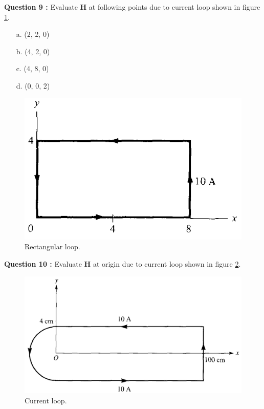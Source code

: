 \documentclass[12pt,a4paper]{article}
\begin{document}
\noindent\textbf{Question 9 \cite[Problem 7.9, page 298]{Sadiku}:} Evaluate \textbf{H} at following points due to current loop shown in figure \ref{rectangular-loop}.
\begin{itemize}
\item[a.] (2, 2, 0)
\item[b.] (4, 2, 0)
\item[c.] (4, 8, 0)
\item[d.] (0, 0, 2)
\end{itemize}
\begin{figure}[H]
\centering
\includegraphics[scale=0.4]{Figure7-30S.png}
\caption{Rectangular loop.}
\label{rectangular-loop}
\end{figure}
\noindent\textbf{Question 10 \cite[Problem 7.9, page 298]{Sadiku}:} Evaluate \textbf{H} at origin due to current loop shown in figure \ref{semi-rectangular-loop}.\\
\begin{figure}[H]
\centering
\includegraphics[scale=0.4]{Figure7-31S.png}
\caption{Current loop.}
\label{semi-rectangular-loop}
\end{figure}
\end{document}
